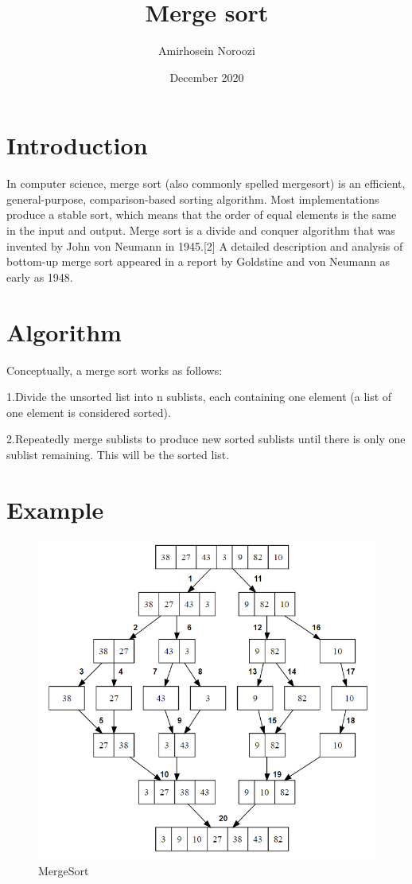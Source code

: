 \documentclass{article}
\title{Merge sort}
\author{Amirhosein Noroozi}
\date{December 2020}
\begin{document}
\maketitle

\section{Introduction}

{In computer science, merge sort (also commonly spelled mergesort) is an efficient, general-purpose, comparison-based sorting algorithm. Most implementations produce a stable sort, which means that the order of equal elements is the same in the input and output. Merge sort is a divide and conquer algorithm that was invented by John von Neumann in 1945.[2] A detailed description and analysis of bottom-up merge sort appeared in a report by Goldstine and von Neumann as early as 1948.}
\section{Algorithm}
  Conceptually, a merge sort works as follows:

    1.Divide the unsorted list into n sublists, each containing one element (a list of one element is considered sorted).

2.Repeatedly merge sublists to produce new sorted sublists until there is only one sublist remaining. This will be the sorted list.
\newpage
\section{Example}
\begin{figure}[h!]
\centering
\includegraphics[scale=0.7]{MergeSort.jpg}
\caption{MergeSort}
\label{fig:MergeSort}
\end{figure}
\newpage
\end{document}
